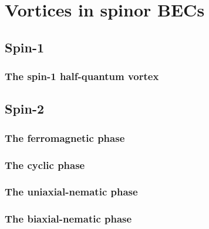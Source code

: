\section{Vortices in spinor BECs}

\subsection{Spin-1}
\subsubsection{The spin-1 half-quantum vortex}

\subsection{Spin-2}

\subsubsection{The ferromagnetic phase}
\subsubsection{The cyclic phase}
\subsubsection{The uniaxial-nematic phase}
\subsubsection{The biaxial-nematic phase}
